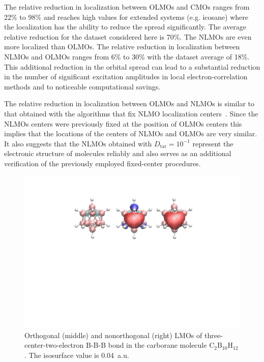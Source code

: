 \documentclass[aps,prl,reprint,amsmath,amssymb]{revtex4-1}
\begin{document}
The relative reduction in localization between OLMOs and CMOs ranges from 22\% to 98\% and reaches high values for extended systems (e.g. icosane) where the localization has the ability to reduce the spread significantly. The average relative reduction for the dataset considered here is 70\%. The NLMOs are even more localized than OLMOs. The relative reduction in localization between NLMOs and OLMOs ranges from 6\% to 30\% with the dataset average of 18\%. This additional reduction in the orbital spread can lead to a substantial reduction in the number of significant excitation amplitudes in local electron-correlation methods and to noticeable computational savings.

The relative reduction in localization between OLMOs and NLMOs is similar to that obtained with the algorithms that fix NLMO localization centers~\cite{feng2004An_efficient, cui2010efficient}. 
Since the NLMOs centers were previously fixed at the position of OLMOs centers this implies that the locations of the centers of NLMOs and OLMOs are very similar. It also suggests that the NLMOs obtained with $D_{\text{tar}}=10^{-1}$ represent the electronic structure of molecules reliably and also serves as an additional verification of the previously employed fixed-center procedures. 

\begin{figure}[htb]
\centering
\includegraphics[scale=0.5]{carborane.pdf}
\caption{Orthogonal (middle) and nonorthogonal (right) LMOs of three-center-two-electron B-B-B bond in the carborane molecule C$_2$B$_{10}$H$_{12}$. The isosurface value is 0.04~a.u.}
\label{fig:boro}
\end{figure}
\end{document}
